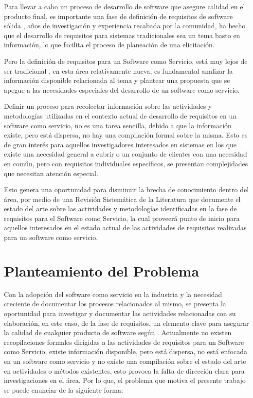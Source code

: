 \documentclass{article}
\begin{document}
Para llevar a cabo un proceso de desarrollo de software que asegure calidad en el producto final, es importante una fase de definición de requisitos de software sólida \cite{antecedentes4}, años de investigación y 
experiencia recabada por la comunidad, ha hecho que el desarrollo de requisitos para sistemas tradicionales sea un tema basto en información, lo que facilita el proceso de planeación de una elicitación.

Pero la definición de requisitos para un Software como Servicio, está muy lejos de ser tradicional \cite{antecedentes1}, en esta área relativamente nueva, es fundamental analizar la 
información disponible relacionada al tema y plantear una propuesta que se apegue a las necesidades especiales del desarrollo de un software como servicio. 

Definir un proceso para recolectar información sobre las actividades y metodologías utilizadas en el contexto actual de desarrollo de requisitos en un software como servicio, no es una tarea sencilla, debido a que la información existe, 
pero está dispersa, no hay una compilación formal sobre la misma. Esto es de gran interés para aquellos investigadores interesados 
en sistemas en los que existe una necesidad general a cubrir o un conjunto de clientes con una necesidad en común, pero con requisitos individuales específicos, se presentan complejidades que necesitan atención especial. 
 
Esto genera una oportunidad para disminuir la brecha de conocimiento dentro del área, por medio de una Revisión Sistemática de la Literatura que documente el estado del arte sobre las actividades y metodologías identificadas
en la fase de requisitos para el Software como Servicio, la cual proveerá punto de inicio para aquellos interesados en el estado actual de las actividades de requisitos realizadas para un software como servicio. 
\newpage

\section{Planteamiento del Problema}
Con la adopción del software como servicio en la industria y la necesidad creciente de documentar los procesos relacionados al mismo, se presenta la oportunidad para investigar y documentar las actividades 
relacionadas con su elaboración, en este caso, de la fase de requisitos, un elemento clave para asegurar la calidad de cualquier 
producto de software según \cite{antecedentes}. Actualmente no existen recopilaciones formales dirigidas a las actividades de requisitos para un Software como Servicio, existe información disponible, 
pero está dispersa, no está enfocada en un software como servicio y no existe una compilación sobre el estado del arte en actividades o métodos existentes, esto provoca la falta de dirección 
clara para investigaciones en el área. Por lo que, el problema que motiva el presente trabajo se puede enunciar de la siguiente forma:\\
\end{document}

